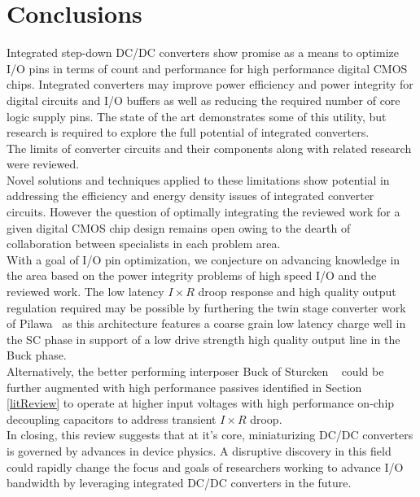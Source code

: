 \documentclass[letterpaper,twocolumn,10pt]{article}
\begin{document}
\section{Conclusions}

Integrated step-down DC/DC converters show promise as a means to optimize I/O pins in terms of count and performance for high performance digital CMOS chips. Integrated converters may improve power efficiency and power integrity for digital circuits and I/O buffers as well as reducing the required number of core logic supply pins. The state of the art demonstrates some of this utility, but research is required to explore the full potential of integrated converters.\\  
The limits of converter circuits and their components along with related research were reviewed.\\
Novel solutions and techniques applied to these limitations show potential in addressing the efficiency and energy density issues of integrated converter circuits. However the question of optimally integrating the reviewed work for a given digital CMOS chip design remains open owing to the dearth of collaboration between specialists in each problem area.\\
\indent With a goal of I/O pin optimization, we conjecture on advancing knowledge in the area based on the power integrity problems of high speed I/O and the reviewed work. The low latency $I \times R$ droop response and high quality output regulation required may be possible by furthering the twin stage converter work of Pilawa~\cite{Pilawa2012} as this architecture features a coarse grain low latency charge well in the SC phase in support of a low drive strength high quality output line in the Buck phase.\\
Alternatively, the better performing interposer Buck of Sturcken ~\cite{Sturcken2013} could be further augmented with high performance passives identified in Section \ref{litReview} to operate at higher input voltages with high performance on-chip decoupling capacitors to address transient $I \times R$ droop.\\
In closing, this review suggests that at it's core, miniaturizing DC/DC converters is governed by advances in device physics. A disruptive discovery in this field could rapidly change the focus and goals of researchers working to advance I/O bandwidth by leveraging integrated DC/DC converters in the future.      


{\footnotesize 
}
\end{document}
